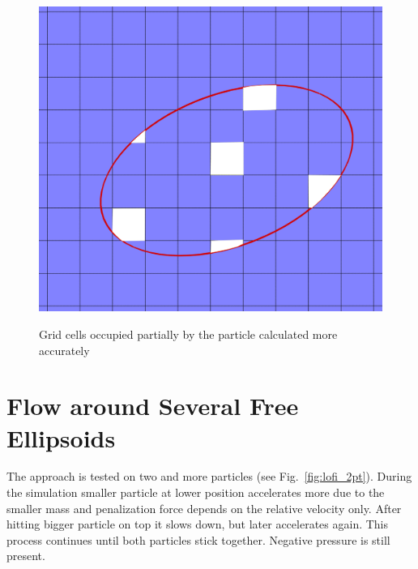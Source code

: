 \begin{figure}[t!]
\centering \includegraphics[scale=0.2]{fig/lofi_vf.png}\\
\caption{Grid cells occupied partially by the particle calculated more accurately \label{fig:lofi-vf}}
\end{figure}

\section{Flow around Several Free Ellipsoids}
The approach is tested on two and more particles (see Fig.~\ref{fig:lofi_2pt}). During the simulation smaller particle at lower position accelerates more due to the smaller mass and penalization force depends on the relative velocity only. After hitting bigger particle on top it slows down, but later accelerates again. This process continues until both particles stick together. Negative pressure is still present.

